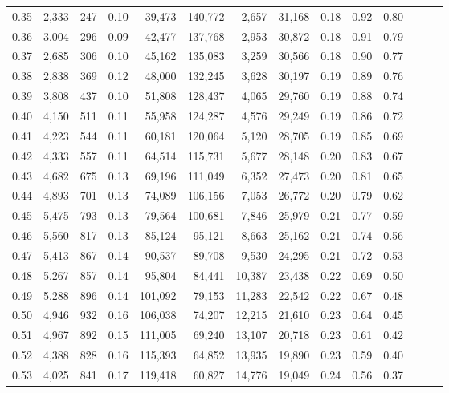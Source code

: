 \begin{tabular}{rrrrrrrrrrrrrr}
0.35 &  2,333 &  247 &  0.10 &   39,473 &  140,772 &   2,657 &  31,168 &  0.18 &  0.92 &      0.80 \\
0.36 &  3,004 &  296 &  0.09 &   42,477 &  137,768 &   2,953 &  30,872 &  0.18 &  0.91 &      0.79 \\
0.37 &  2,685 &  306 &  0.10 &   45,162 &  135,083 &   3,259 &  30,566 &  0.18 &  0.90 &      0.77 \\
0.38 &  2,838 &  369 &  0.12 &   48,000 &  132,245 &   3,628 &  30,197 &  0.19 &  0.89 &      0.76 \\
0.39 &  3,808 &  437 &  0.10 &   51,808 &  128,437 &   4,065 &  29,760 &  0.19 &  0.88 &      0.74 \\
0.40 &  4,150 &  511 &  0.11 &   55,958 &  124,287 &   4,576 &  29,249 &  0.19 &  0.86 &      0.72 \\
0.41 &  4,223 &  544 &  0.11 &   60,181 &  120,064 &   5,120 &  28,705 &  0.19 &  0.85 &      0.69 \\
0.42 &  4,333 &  557 &  0.11 &   64,514 &  115,731 &   5,677 &  28,148 &  0.20 &  0.83 &      0.67 \\
0.43 &  4,682 &  675 &  0.13 &   69,196 &  111,049 &   6,352 &  27,473 &  0.20 &  0.81 &      0.65 \\
0.44 &  4,893 &  701 &  0.13 &   74,089 &  106,156 &   7,053 &  26,772 &  0.20 &  0.79 &      0.62 \\
0.45 &  5,475 &  793 &  0.13 &   79,564 &  100,681 &   7,846 &  25,979 &  0.21 &  0.77 &      0.59 \\
0.46 &  5,560 &  817 &  0.13 &   85,124 &   95,121 &   8,663 &  25,162 &  0.21 &  0.74 &      0.56 \\
0.47 &  5,413 &  867 &  0.14 &   90,537 &   89,708 &   9,530 &  24,295 &  0.21 &  0.72 &      0.53 \\
0.48 &  5,267 &  857 &  0.14 &   95,804 &   84,441 &  10,387 &  23,438 &  0.22 &  0.69 &      0.50 \\
0.49 &  5,288 &  896 &  0.14 &  101,092 &   79,153 &  11,283 &  22,542 &  0.22 &  0.67 &      0.48 \\
0.50 &  4,946 &  932 &  0.16 &  106,038 &   74,207 &  12,215 &  21,610 &  0.23 &  0.64 &      0.45 \\
0.51 &  4,967 &  892 &  0.15 &  111,005 &   69,240 &  13,107 &  20,718 &  0.23 &  0.61 &      0.42 \\
0.52 &  4,388 &  828 &  0.16 &  115,393 &   64,852 &  13,935 &  19,890 &  0.23 &  0.59 &      0.40 \\
0.53 &  4,025 &  841 &  0.17 &  119,418 &   60,827 &  14,776 &  19,049 &  0.24 &  0.56 &      0.37 \\

\end{tabular}

